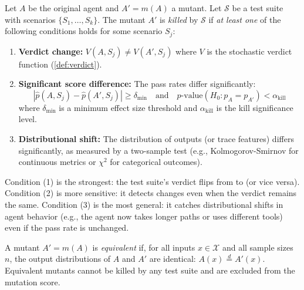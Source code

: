 \begin{definition}
\label{def:kill}
Let $A$ be the original agent and $A' = m(A)$ a mutant. Let
$\mathcal{S}$ be a test suite with scenarios $\{S_1, \ldots, S_k\}$.
The mutant $A'$ is \emph{killed} by $\mathcal{S}$ if \emph{at least
one} of the following conditions holds for some scenario $S_j$:
\begin{enumerate}[leftmargin=*]
  \item \textbf{Verdict change:} $V(A, S_j) \neq V(A', S_j)$ where $V$
    is the stochastic verdict function (\cref{def:verdict}).

  \item \textbf{Significant score difference:} The pass rates differ
    significantly:
    \begin{equation}
    \label{eq:kill-score}
      |\hat{p}(A, S_j) - \hat{p}(A', S_j)| \geq \delta_{\min}
      \quad\text{and}\quad
      p\text{-value}(H_0: p_A = p_{A'}) < \alpha_{\text{kill}}
    \end{equation}
    where $\delta_{\min}$ is a minimum effect size threshold and
    $\alpha_{\text{kill}}$ is the kill significance level.

  \item \textbf{Distributional shift:} The distribution of outputs
    (or trace features) differs significantly, as measured by a
    two-sample test (e.g., Kolmogorov-Smirnov for continuous metrics
    or $\chi^2$ for categorical outcomes).
\end{enumerate}
\end{definition}

\begin{remark}
Condition (1) is the strongest: the test suite's verdict flips from
\PASS{} to \FAIL{} (or vice versa). Condition (2) is more sensitive: it
detects changes even when the verdict remains the same. Condition (3) is
the most general: it catches distributional shifts in agent behavior
(e.g., the agent now takes longer paths or uses different tools) even
if the pass rate is unchanged.
\end{remark}

\begin{definition}
\label{def:equivalent-mutant}
A mutant $A' = m(A)$ is \emph{equivalent} if, for all inputs
$x \in \mathcal{X}$ and all sample sizes $n$, the output distributions
of $A$ and $A'$ are identical: $A(x) \overset{d}{=} A'(x)$. Equivalent
mutants cannot be killed by any test suite and are excluded from the
mutation score.
\end{definition}

